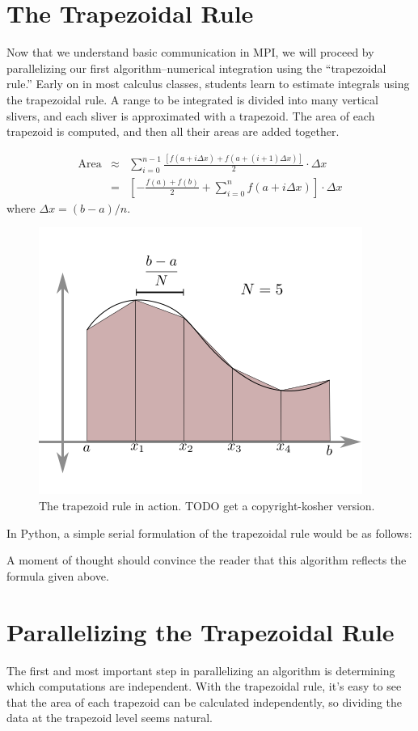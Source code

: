 \section*{The Trapezoidal Rule}
Now that we understand basic communication in MPI, we will proceed by parallelizing our first algorithm--numerical integration using the ``trapezoidal rule.'' Early on in most calculus classes, students learn to estimate integrals using the trapezoidal rule. A range to be integrated is divided into many vertical slivers, and each sliver is approximated with a trapezoid. The area of each trapezoid is computed, and then all their areas are added together.

\begin{eqnarray*}%
\textrm{Area} 
&\approx&
\sum_{i=0}^{n-1}\frac{[f(a+i \Delta x)+f(a + (i+1) \Delta x)]}{2}\cdot\Delta x \\
&=&
\left[-\frac{f(a)+f(b)}{2}+\sum_{i=0}^{n}f(a+i\Delta x)\right]\cdot\Delta x
\end{eqnarray*}
where $\Delta x=(b-a)/n$.

\begin{figure}[h]
\centering
\includegraphics[width=.5\textwidth]{TrapezoidRule.png}
\caption{The trapezoid rule in action. TODO get a copyright-kosher version.}
\label{fig:trapezoidal_rule}
\end{figure}

In Python, a simple serial formulation of the trapezoidal rule would be as follows:



A moment of thought should convince the reader that this algorithm reflects the formula given above. 

\section*{Parallelizing the Trapezoidal Rule}
The first and most important step in parallelizing an algorithm is determining which computations are independent. With the trapezoidal rule, it's easy to see that the area of each trapezoid can be calculated independently, so dividing the data at the trapezoid level seems natural.

